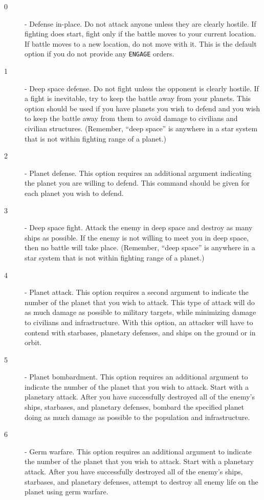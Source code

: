 \documentclass[10pt,titlepage]{article}
\begin{document}
\begin{description}
 	\item[0] -	Defense in-place.  Do not attack anyone unless they are
		clearly hostile.  If fighting does start, fight only if
		the battle moves to your current location.  If battle
		moves to a new location, do not move with it.  This
		is the default option if you do not provide any \texttt{ENGAGE}
		orders.

	\item[1] -	Deep space defense.  Do not fight unless the opponent is
		clearly hostile.  If a fight is inevitable, try to keep the
		battle away from your planets.  This option should be used
		if you have planets you wish to defend and you wish to keep
		the battle away from them to avoid damage to civilians and
		civilian structures.  (Remember, ``deep space'' is anywhere in
		a star system that is not within fighting range of a planet.)

	\item[2] -	Planet defense.  This option requires an additional argument
		indicating the planet you are willing to defend.  This
		command should be given for each planet you wish to defend.

	\item[3] -	Deep space fight.  Attack the enemy in deep space and destroy
		as many ships as possible.  If the enemy is not willing to meet
		you in deep space, then no battle will take place.  (Remember,
		``deep space'' is anywhere in a star system that is not within
		fighting range of a planet.)

	\item[4] -	Planet attack.  This option requires a second argument to
		indicate the number of the planet that you wish to attack.
		This type of attack will do as much damage as possible to
		military targets, while minimizing damage to civilians and
		infrastructure.  With this option, an attacker will have
		to contend with starbases, planetary defenses, and ships
		on the ground or in orbit.

	\item[5] -	Planet bombardment.  This option requires an additional
		argument to indicate the number of the planet that you wish
		to attack.  Start with a planetary attack.  After you have
		successfully destroyed all of the enemy's ships, starbases,
		and planetary defenses, bombard the specified planet doing as
		much damage as possible to the population and infrastructure.

	\item[6] -	Germ warfare.  This option requires an additional argument to
		indicate the number of the planet that you wish to attack.
		Start with a planetary attack.  After you have successfully
		destroyed all of the enemy's ships, starbases, and planetary
		defenses, attempt to destroy all enemy life on the planet
		using germ warfare.


\end{description}
\end{document}
